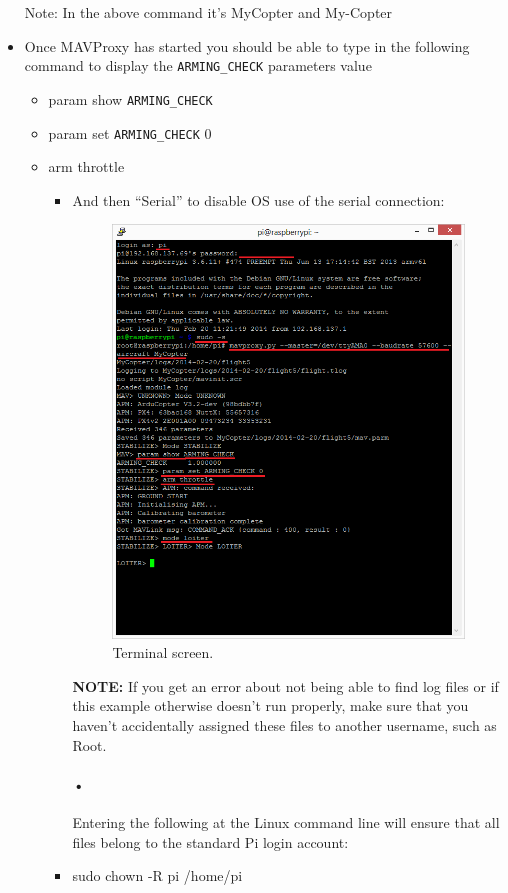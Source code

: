 \documentclass[a4paper,12pt,oneside]{book}
\begin{document}
\begin{itemize}
				 
				Note: In the above command it's MyCopter and My-Copter
				\item Once MAVProxy has started you should be able to type in the following command to display the \texttt{ARMING\_CHECK} parameters value
				\begin{itemize}
					\item param show \texttt{ARMING\_CHECK}
					\item param set \texttt{ARMING\_CHECK} 0
					\item arm throttle
					\begin{itemize}
			\item And then “Serial” to disable OS use of the serial connection:
			\begin{figure}[H]
	 	\centering
		\includegraphics[scale=0.6]{connect}
		\caption{Terminal screen.}
\end{figure}
	\textbf{NOTE:} If you get an error about not being able to find log files or if this example otherwise doesn’t run properly, make sure that you haven’t accidentally assigned these files to another username, such as Root.
	\paragraph{•}Entering the following at the Linux command line will ensure that all files belong to the standard Pi login account:
	\item sudo chown -R pi /home/pi
		\end{itemize}
				\end{itemize}
				
			\end{itemize}
\end{document}
